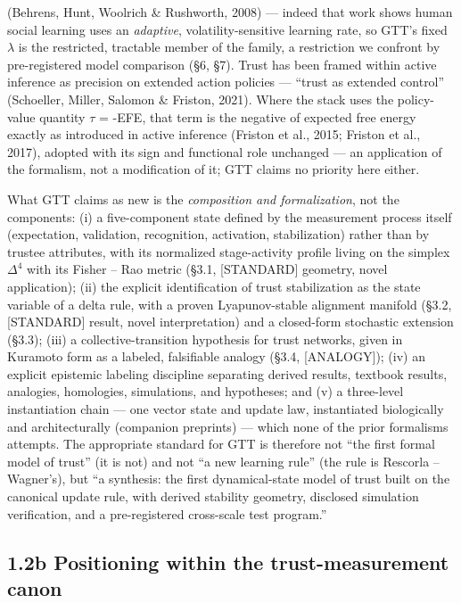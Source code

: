 \documentclass[
]{article}
\newcounter{none} %
\begin{document}
\begin{itemize}
  (Behrens, Hunt, Woolrich \& Rushworth, 2008) --- indeed that work
  shows human social learning uses an \emph{adaptive},
  volatility-sensitive learning rate, so GTT's fixed \(\lambda\) is the
  restricted, tractable member of the family, a restriction we confront
  by pre-registered model comparison (§6, §7). Trust has been framed
  within active inference as precision on extended action policies ---
  ``trust as extended control'' (Schoeller, Miller, Salomon \& Friston,
  2021). Where the stack uses the policy-value quantity \(\tau\) = -EFE,
  that term is the negative of expected free energy exactly as
  introduced in active inference (Friston et al., 2015; Friston et al.,
  2017), adopted with its sign and functional role unchanged --- an
  application of the formalism, not a modification of it; GTT claims no
  priority here either.
\end{itemize}

What GTT claims as new is the \emph{composition and formalization}, not
the components: (i) a five-component state defined by the measurement
process itself (expectation, validation, recognition, activation,
stabilization) rather than by trustee attributes, with its normalized
stage-activity profile living on the simplex \(\Delta^{4}\) with its
Fisher -- Rao metric (§3.1, {[}STANDARD{]} geometry, novel application);
(ii) the explicit identification of trust stabilization as the state
variable of a delta rule, with a proven Lyapunov-stable alignment
manifold (§3.2, {[}STANDARD{]} result, novel interpretation) and a
closed-form stochastic extension (§3.3); (iii) a collective-transition
hypothesis for trust networks, given in Kuramoto form as a labeled,
falsifiable analogy (§3.4, {[}ANALOGY{]}); (iv) an explicit epistemic
labeling discipline separating derived results, textbook results,
analogies, homologies, simulations, and hypotheses; and (v) a
three-level instantiation chain --- one vector state and update law,
instantiated biologically and architecturally (companion preprints) ---
which none of the prior formalisms attempts. The appropriate standard
for GTT is therefore not ``the first formal model of trust'' (it is not)
and not ``a new learning rule'' (the rule is Rescorla -- Wagner's), but
``a synthesis: the first dynamical-state model of trust built on the
canonical update rule, with derived stability geometry, disclosed
simulation verification, and a pre-registered cross-scale test
program.''

\subsection{1.2b Positioning within the trust-measurement
canon}\label{b-positioning-within-the-trust-measurement-canon}
\end{document}
